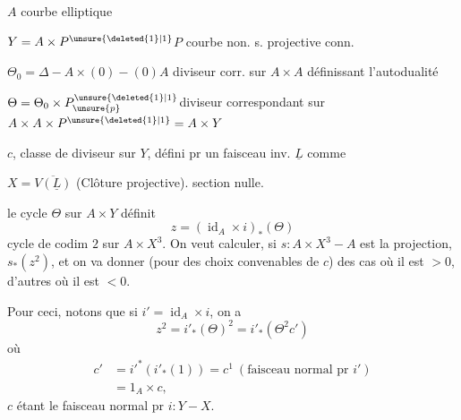 
$A$ courbe elliptique

$Y=A\times P^{\unsure{\deleted{1}|1}}$\qquad $P$ courbe non. s. projective conn.

$\Theta_0=\Delta-A\times(0)-(0)A$  diviseur corr. sur $A\times A$ définissant l'autodualité

$\Theta=\Theta_0\times P_{\unsure{p}}^{\unsure{\deleted{1}|1}}$\qquad diviseur correspondant sur $A\times A\times P^{\unsure{\deleted{1}|1}}=A\times Y$

$c$, classe de diviseur sur $Y$, défini pr un  faisceau inv. $\underline L$ comme 

$X=\overline{V(\underline L)}$ (Clôture projective).
section nulle.

le cycle $\Theta$ sur $A\times Y$ définit
\[
z=(\operatorname{id}_A\times i)_*(\Theta)
\]
cycle de codim $2$ sur  $A\times X^3$. On veut calculer, si $s:A\times X^3\mathbin{-}A$ est la projection, $s_*(z^2)$, et on va donner (pour des choix convenables de $c$) des cas où il est $>0$, d'autres où il est $<0$.

Pour ceci, notons que si $i'=\operatorname{id}_A\times i$, on a
\[
z^2=i'_*(\Theta)^2=i'_*(\Theta^2c')
\]
où
\[
\begin{aligned}
c'&=i'^*(i'_*(1))=c^1\ (\text{faisceau normal pr }i')\\
&=1_A\times c,
\end{aligned}
\]
$c$ étant le faisceau normal pr  $i:Y\mathbin{-}X$.


